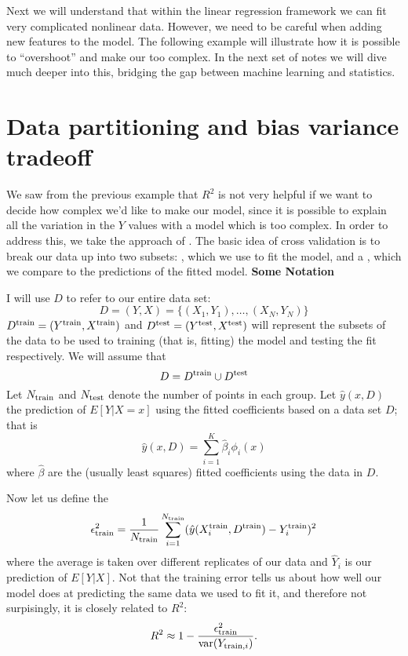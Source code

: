 Next we will  understand that within the linear regression framework we can fit very complicated nonlinear data. However, we need to be careful when adding new features to the model. The following example will illustrate how it is possible to ``overshoot'' and make our too complex. In the next set of notes we will dive much deeper into this, bridging the gap between machine learning and statistics. 


\section{Data partitioning and bias variance tradeoff}

We saw from the previous example that $R^2$ is not very helpful if we want to decide how complex we'd like to make our model, since it is possible to explain all the variation in the $Y$ values with a model which is too complex. In order to address this, we take the approach of . The basic idea of cross validation is to break our data up into two subsets: , which we use to fit the model, and a , which we compare to the predictions of the fitted model. 
 {\bf Some Notation}

 I will use $D$ to refer to our entire data set:
\begin{equation*}
D = (Y,X) = \{(X_1,Y_1),\dots,(X_N,Y_N)\}
\end{equation*}
 $D^{\rm train} = (Y^{\rm train},X^{\rm train})$ and $D^{\rm test} = (Y^{\rm test},X^{\rm test})$ will represent the subsets of the data to be used to training (that is, fitting) the model and testing the fit respectively.  We will assume that
\begin{equation*}
D = D^{\rm train} \cup D^{\rm test}
\end{equation*}
 Let $N_{\rm train}$ and $N_{\rm test}$ denote the number of points in each group.
 Let $\hat{y}(x,D)$ the prediction of $E[Y|X =x]$ using the fitted coefficients based on a data set $D$; that is
\begin{equation*}
\hat{y}(x,D) = \sum_{i=1}^{K}\hat{\beta}_i\phi_i(x)
\end{equation*} 
where $\hat{\beta}$ are the (usually least squares) fitted coefficients using the data in $D$. 




Now let us define the 
\begin{equation*}
\epsilon_{\rm train}^2=  \frac{1}{N_{\rm train}}\sum_{i=1}^{N_{\rm train}}(\hat{y}(X_i^{\rm train},D^{\rm train}) - Y_i^{\rm train})^2
\end{equation*}
where the average is taken over different replicates of our data and $\hat{Y}_i$ is our prediction of $E[Y|X]$. Not that the training error tells us about how well our model does at predicting the same data we used to fit it, and therefore not surpisingly, it is closely related to $R^2$:
\begin{equation*}
R^2 \approx 1 - \frac{\epsilon_{\rm train}^2}{{\rm var}(Y_{{\rm train},i})}.
\end{equation*}

